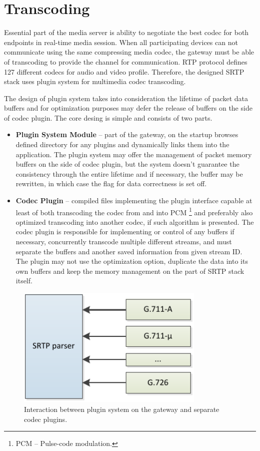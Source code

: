 \section{Transcoding}
Essential part of the media server is ability to negotiate the best codec for
both endpoints in real-time media session. When all participating devices can
not communicate using the same compressing media codec, the gateway must be able
of transcoding to provide the channel for communication. RTP protocol defines
127 different codecs for audio and video profile. Therefore, the designed 
SRTP stack uses plugin system for multimedia codec transcoding.

The design of plugin system takes into consideration the lifetime of packet data buffers and  for optimization purposes may defer the release of buffers on the side of codec plugin. The core desing is simple and consists of two parts.

\begin{itemize}
\item \textbf{Plugin System Module} -- part of the gateway, on the startup 
browses defined directory for any plugins and dynamically links them into the 
application. The plugin system may offer the management of packet memory buffers
on the side of codec plugin, but the system doesn't guarantee the consistency 
through the entire lifetime and if necessary, the buffer may be rewritten, in 
which case the flag for data correctness is set off. 
\item \textbf{Codec Plugin} -- compiled files implementing the plugin interface
capable at least of both transcoding the codec from and into PCM \footnote{ PCM 
-- Pulse-code modulation.} and preferably also optimized transcoding into
another codec, if such algorithm is presented. The codec plugin is responsible
for implementing or control of any buffers if necessary, concurrently transcode 
multiple different streams, and must separate the buffers and another saved 
information from given stream ID. The plugin may not use the optimization 
option, duplicate the data into its own buffers and keep the memory management
on the part of SRTP stack itself.  
\end{itemize}  

\begin{figure}[H]
\centering
\includegraphics[width=9cm]{fig/plugins.pdf}
\caption{Interaction between plugin system on the gateway and separate codec 
plugins.}
\label{pt_payload}
\end{figure} 



